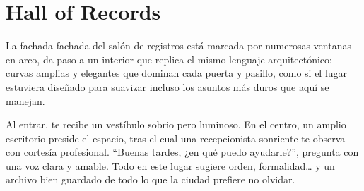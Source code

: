 \section{Hall of Records} 

La fachada fachada del salón de registros está marcada por numerosas ventanas
en arco, da paso a un interior que replica el mismo lenguaje arquitectónico:
curvas amplias y elegantes que dominan cada puerta y pasillo, como si el lugar
estuviera diseñado para suavizar incluso los asuntos más duros que aquí se
manejan.

Al entrar, te recibe un vestíbulo sobrio pero luminoso. En el centro, un amplio
escritorio preside el espacio, tras el cual una recepcionista sonriente te
observa con cortesía profesional. “Buenas tardes, ¿en qué puedo ayudarle?”,
pregunta con una voz clara y amable. Todo en este lugar sugiere orden,
formalidad… y un archivo bien guardado de todo lo que la ciudad prefiere no
olvidar.
